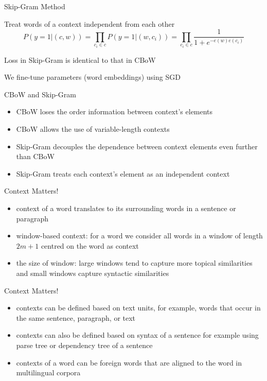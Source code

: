 \documentclass[12pt, handout]{beamer}
\begin{document}
\begin{frame}{Skip-Gram Method}

Treat words of a context independent from each other
\begin{equation*}
P(y=1|(c,w)) = \prod_{c_i \in c} P(y=1|(w,c_i)) = \prod_{c_i \in c} \frac{1}{1+e^{-e(w)e(c_i)}}
\end{equation*}

Loss in Skip-Gram is identical to that in CBoW

We fine-tune parameters (word embeddings) using SGD

\end{frame}
\begin{frame}{CBoW and Skip-Gram}
	\begin{itemize}
		\item<1-> CBoW loses the order information between context's elements
		\item<2-> CBoW allows the use of variable-length contexts
		\item<3-> Skip-Gram decouples the dependence between context elements even further than CBoW
		\item<4-> Skip-Gram treats each context's element as an independent context
	\end{itemize}
\end{frame}
\begin{frame}{Context Matters!}
	\begin{itemize}
		\item<1-> context of a word translates to its surrounding words in a sentence or paragraph
		\item<2-> window-based context: for a word  we consider all words in a window of length $2m+1$ centred on the word as context
		\item<3-> the size of window: large windows tend to capture more topical similarities and small windows capture syntactic similarities 
	\end{itemize}
\end{frame}

\begin{frame}{Context Matters!}
	\begin{itemize}
		\item<4-> contexts can be defined based on text units, for example, words that occur in the same sentence, paragraph, or text
		\item<5-> contexts can also be defined based on syntax of a sentence for example using parse tree or dependency tree of a sentence
		\item<6-> contexts of a word can be foreign words that are aligned to the word in multilingual corpora
	\end{itemize}
\end{frame}
\end{document}
